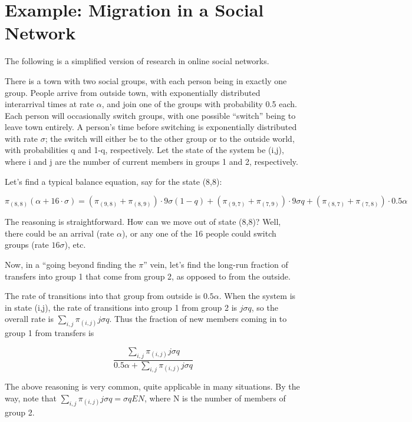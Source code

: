 \section{Example:  Migration in a Social Network}

The following is a simplified version of research in online social
networks.

There is a town with two social groups, with each person being in
exactly one group.  People arrive from outside town, with exponentially
distributed interarrival times at rate $\alpha$, and join one of the
groups with probability 0.5 each.  Each person will occasionally switch
groups, with one possible ``switch'' being to leave town entirely.  A
person's time before switching is exponentially distributed with rate
$\sigma$; the switch will either be to the other group or to the outside
world, with probabilities q and 1-q, respectively.  Let the state of the
system be (i,j), where i and j are the number of current members in
groups 1 and 2, respectively.

Let's find a typical balance equation, say for the state (8,8):

\begin{equation}
\pi_{(8,8)} (\alpha + 16 \cdot \sigma ) =
( \pi_{(9,8)} + \pi_{(8,9)}) \cdot 9 \sigma (1-q) +
( \pi_{(9,7)} + \pi_{(7,9)}) \cdot 9 \sigma q +
( \pi_{(8,7)} + \pi_{(7,8)}) \cdot 0.5 \alpha
\end{equation}

The reasoning is straightforward.  How can we move out of state (8,8)?
Well, there could be an arrival (rate $\alpha$), or any one of the 16
people could switch groups (rate $16 \sigma$), etc.

Now, in a ``going beyond finding the $\pi$'' vein, let's find the
long-run fraction of transfers into group 1 that come from group 2, as
opposed to from the outside.

The rate of transitions into that group from outside is $0.5 \alpha$.
When the system is in state (i,j), the rate of transitions into group 1
from group 2 is $j \sigma q$, so the overall rate is $\sum_{i,j}
\pi_{(i,j)} j \sigma q$.  Thus the fraction of new members coming in to
group 1 from transfers is

\begin{equation}
\frac{\sum_{i,j} \pi_{(i,j)} j \sigma q}
{0.5 \alpha + \sum_{i,j} \pi_{(i,j)} j \sigma q}
\end{equation}

The above reasoning is very common, quite applicable in many situations.
By the way, note that $\sum_{i,j} \pi_{(i,j)} j \sigma q = \sigma q EN$,
where N is the number of members of group 2.


